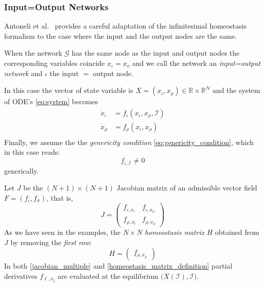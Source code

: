 \documentclass[a4paper,fleqn]{cas-dc}
\newcommand{\II}{{\mathcal I}}
\newcommand{\etal}{\textrm{et al.}}
\begin{document}
\subsubsection{Input=Output Networks}

Antoneli \etal~\cite{antoneli2024} provides a careful adaptation of the infinitesimal homeostasis formalism to the case where the input and the output nodes are the same. 
 
When the network $\mathcal{G}$ has the same node as the input and output nodes the corresponding variables coincide $x_\iota=x_o$ and we call the network an \emph{input=output network} and $\iota$ the input $=$ output node.

In this case the vector of state variable is $X=(x_{\iota},x_{\rho})\in\mathbb{R}\times\mathbb{R}^N$ and the system of ODE's \eqref{eq:system} becomes
\begin{equation}  \label{admissible_systems_ODE_IO}
\begin{aligned}
\dot{x}_{\iota} & = f_{\iota}(x_{\iota}, x_{\rho}, \mathcal{I}) \\
\dot{x}_{\rho} & = f_{\rho}(x_{\iota}, x_{\rho})\\
\end{aligned}
\end{equation}
Finally, we assume the the \emph{genericity condition} \eqref{eq:genericity_condition}, which in this case reads:
\[
 f_{\iota,\II} \neq 0
\]
generically.

Let $J$ be the $(N+1)\times (N+1)$ Jacobian matrix of an admissible vector field $F=(f_{\iota},f_{\sigma})$, that is,
\begin{equation} \label{jacobian_general}
J = \begin{pmatrix}
  f_{\iota, x_{\iota}}   &  f_{\iota, x_\rho} \\
  f_{\rho, x_{\iota}}   &  f_{\rho, x_\rho} 
\end{pmatrix}
\end{equation}
As we have seen in the examples, the $N\times N$ \emph{homeostasis matrix} $H$ obtained from $J$ by removing the \emph{first row}:
\begin{equation}
\label{homeostasis_matrix_definition}
H = 
\begin{pmatrix}
f_{\rho, x_\rho}
\end{pmatrix}
\end{equation}
In both \eqref{jacobian_multiple} and \eqref{homeostasis_matrix_definition} partial derivatives $f_{\ell,x_j}$ are evaluated at the equilibrium $\big(X(\mathcal{I}),\mathcal{I}\big)$.
\end{document}
